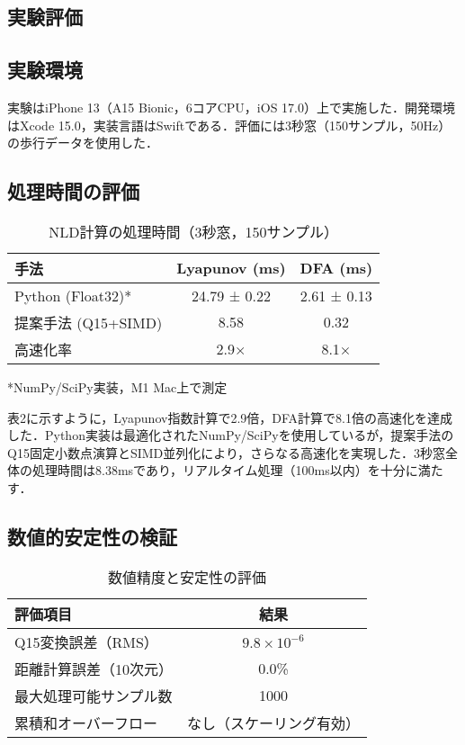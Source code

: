 \documentclass[10pt,twocolumn]{article}
\begin{document}
\begin{CJK}{UTF8}{min}
\section{実験評価}

\subsection{実験環境}

実験はiPhone 13（A15 Bionic，6コアCPU，iOS 17.0）上で実施した．開発環境はXcode 15.0，実装言語はSwiftである．評価には3秒窓（150サンプル，50Hz）の歩行データを使用した．

\subsection{処理時間の評価}

\begin{table}[t]
\caption{NLD計算の処理時間（3秒窓，150サンプル）}
\centering
\begin{tabular}{lcc}
\toprule
手法 & Lyapunov (ms) & DFA (ms) \\
\midrule
Python (Float32)* & 24.79 ± 0.22 & 2.61 ± 0.13 \\
提案手法 (Q15+SIMD) & 8.58 & 0.32 \\
\midrule
高速化率 & 2.9× & 8.1× \\
\bottomrule
\end{tabular}
\footnotesize{*NumPy/SciPy実装，M1 Mac上で測定}
\end{table}

表2に示すように，Lyapunov指数計算で2.9倍，DFA計算で8.1倍の高速化を達成した．Python実装は最適化されたNumPy/SciPyを使用しているが，提案手法のQ15固定小数点演算とSIMD並列化により，さらなる高速化を実現した．3秒窓全体の処理時間は8.38msであり，リアルタイム処理（100ms以内）を十分に満たす．

\subsection{数値的安定性の検証}

\begin{table}[t]
\caption{数値精度と安定性の評価}
\centering
\begin{tabular}{lc}
\toprule
評価項目 & 結果 \\
\midrule
Q15変換誤差（RMS） & $9.8 \times 10^{-6}$ \\
距離計算誤差（10次元） & 0.0\% \\
最大処理可能サンプル数 & 1000 \\
累積和オーバーフロー & なし（スケーリング有効） \\
\bottomrule
\end{tabular}
\end{table}


\end{CJK}
\end{document}
